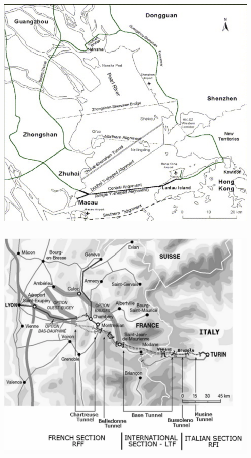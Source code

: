 {\begin{columns}
\begin{column}{0.5\linewidth}
\end{column}
\begin{column}{0.5\linewidth}

\vspace{-0.8cm}
\begin{center}
\includegraphics[width=0.7\linewidth,height=0.35\textheight]{figures/HZMB.png}
\end{center}

\vspace{-0.5cm}
\cite{yang2006geopolitics}

\hrule

\begin{center}
\includegraphics[width=0.7\linewidth]{figures/LyonTurin.png}
\end{center}

\vspace{-0.5cm}
\cite{marincioni2009lyon}

\end{column}
\end{columns}

}




